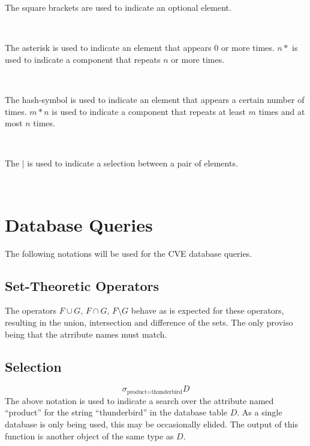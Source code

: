 The square brackets are used to indicate an optional element.
\begin{bnf*}
\\
\end{bnf*}

The asterisk is used to indicate an element that appears 0 or more times. $n*$ is used to indicate a component that repeats $n$ or more times.
\begin{bnf*}
\\
\end{bnf*}

The hash-symbol is used to indicate an element that appears a certain number of times. $m*n$ is used to indicate a component that repeats at least $m$ times and at most $n$ times.
\begin{bnf*}
\\
\end{bnf*}

The $|$ is used to indicate a selection between a pair of elements.
\begin{bnf*}
\\
\end{bnf*}

\section{Database Queries}
The following notations will be used for the CVE database queries.
\subsection{Set-Theoretic Operators}
The operators $F\cup G$, $F \cap G$, $F\setminus G$ behave as is expected for these operators, resulting in the union, intersection and difference of the sets.  The only proviso being that the atrribute names must match.
\subsection{Selection}
\[\sigma_{\text{product}=\text{thunderbird}}D\]
The above notation is used to indicate a search over the attribute named ``product'' for the string ``thunderbird'' in the database table $D$.  As a single database is only being used, this may be occasionally elided.  The output of this function is another object of the same type as $D$.

